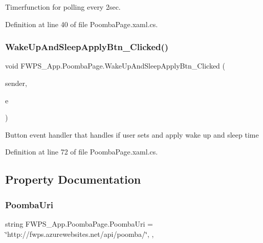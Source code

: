 Timerfunction for polling every 2sec. 



Definition at line 40 of file Poomba\+Page.\+xaml.\+cs.

\mbox{\label{class_f_w_p_s___app_1_1_poomba_page_a7326d5d8719462577aa4baff9d579c44}} 
\subsubsection{\texorpdfstring{Wake\+Up\+And\+Sleep\+Apply\+Btn\+\_\+\+Clicked()}{WakeUpAndSleepApplyBtn\_Clicked()}}
{\footnotesize\ttfamily void F\+W\+P\+S\+\_\+\+App.\+Poomba\+Page.\+Wake\+Up\+And\+Sleep\+Apply\+Btn\+\_\+\+Clicked (\begin{DoxyParamCaption}\item[{object}]{sender,  }\item[{Event\+Args}]{e }\end{DoxyParamCaption})\hspace{0.3cm}{\ttfamily [private]}}

Button event handler that handles if user sets and apply wake up and sleep time 

Definition at line 72 of file Poomba\+Page.\+xaml.\+cs.



\subsection{Property Documentation}
\mbox{\label{class_f_w_p_s___app_1_1_poomba_page_a1f47415b0a34565bf93db8d8d08444f9}} 
\subsubsection{\texorpdfstring{Poomba\+Uri}{PoombaUri}}
{\footnotesize\ttfamily string F\+W\+P\+S\+\_\+\+App.\+Poomba\+Page.\+Poomba\+Uri = \char`\"{}http\+://fwps.\+azurewebsites.\+net/api/poomba/\char`\"{}\hspace{0.3cm}{\ttfamily [static]}, {\ttfamily [get]}, {\ttfamily [set]}}



